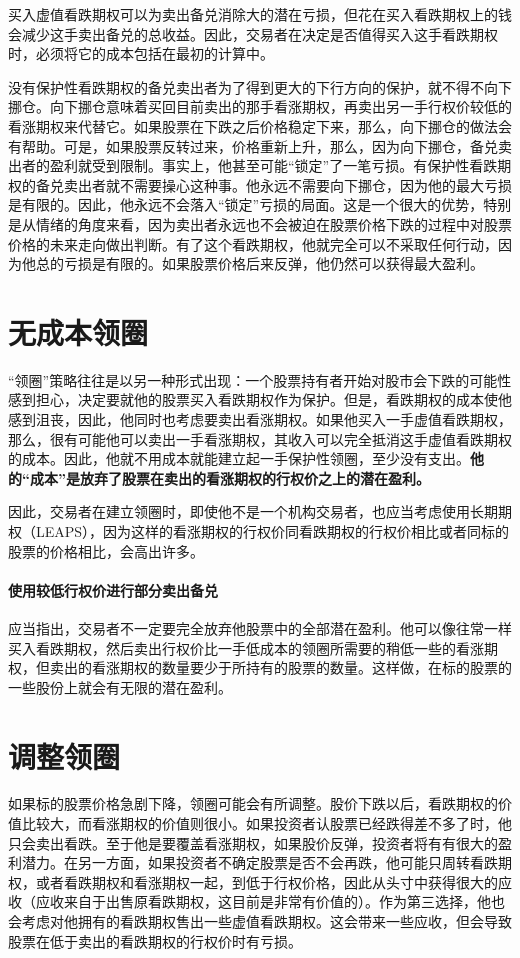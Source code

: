 买入虚值看跌期权可以为卖出备兑消除大的潜在亏损，但花在买入看跌期权上的钱会减少这手卖出备兑的总收益。因此，交易者在决定是否值得买入这手看跌期权时，必须将它的成本包括在最初的计算中。


没有保护性看跌期权的备兑卖出者为了得到更大的下行方向的保护，就不得不向下挪仓。向下挪仓意味着买回目前卖出的那手看涨期权，再卖出另一手行权价较低的看涨期权来代替它。如果股票在下跌之后价格稳定下来，那么，向下挪仓的做法会有帮助。可是，如果股票反转过来，价格重新上升，那么，因为向下挪仓，备兑卖出者的盈利就受到限制。事实上，他甚至可能“锁定”了一笔亏损。有保护性看跌期权的备兑卖出者就不需要操心这种事。他永远不需要向下挪仓，因为他的最大亏损是有限的。因此，他永远不会落入“锁定”亏损的局面。这是一个很大的优势，特别是从情绪的角度来看，因为卖出者永远也不会被迫在股票价格下跌的过程中对股票价格的未来走向做出判断。有了这个看跌期权，他就完全可以不采取任何行动，因为他总的亏损是有限的。如果股票价格后来反弹，他仍然可以获得最大盈利。

\section{无成本领圈}
“领圈”策略往往是以另一种形式出现：一个股票持有者开始对股市会下跌的可能性感到担心，决定要就他的股票买入看跌期权作为保护。但是，看跌期权的成本使他感到沮丧，因此，他同时也考虑要卖出看涨期权。如果他买入一手虚值看跌期权，那么，很有可能他可以卖出一手看涨期权，其收入可以完全抵消这手虚值看跌期权的成本。因此，他就不用成本就能建立起一手保护性领圈，至少没有支出。\textbf{他的“成本”是放弃了股票在卖出的看涨期权的行权价之上的潜在盈利。}

因此，交易者在建立领圈时，即使他不是一个机构交易者，也应当考虑使用长期期权（LEAPS），因为这样的看涨期权的行权价同看跌期权的行权价相比或者同标的股票的价格相比，会高出许多。
\paragraph{使用较低行权价进行部分卖出备兑}
应当指出，交易者不一定要完全放弃他股票中的全部潜在盈利。他可以像往常一样买入看跌期权，然后卖出行权价比一手低成本的领圈所需要的稍低一些的看涨期权，但卖出的看涨期权的数量要少于所持有的股票的数量。这样做，在标的股票的一些股份上就会有无限的潜在盈利。
\section{调整领圈}
如果标的股票价格急剧下降，领圈可能会有所调整。股价下跌以后，看跌期权的价值比较大，而看涨期权的价值则很小。如果投资者认股票已经跌得差不多了时，他只会卖出看跌。至于他是要覆盖看涨期权，如果股价反弹，投资者将有有很大的盈利潜力。在另一方面，如果投资者不确定股票是否不会再跌，他可能只周转看跌期权，或者看跌期权和看涨期权一起，到低于行权价格，因此从头寸中获得很大的应收（应收来自于出售原看跌期权，这目前是非常有价值的）。作为第三选择，他也会考虑对他拥有的看跌期权售出一些虚值看跌期权。这会带来一些应收，但会导致股票在低于卖出的看跌期权的行权价时有亏损。


